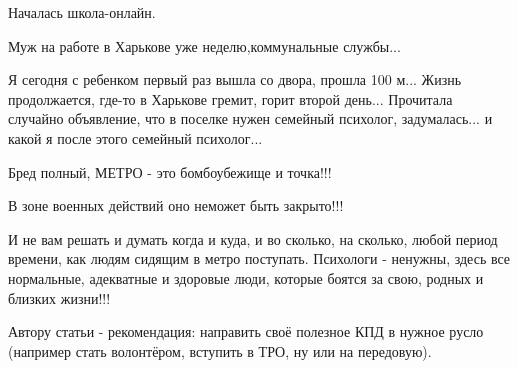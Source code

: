 \begin{itemize}
Началась школа-онлайн.

Муж на работе в Харькове уже неделю,коммунальные службы...

Я сегодня с ребенком первый раз вышла со двора, прошла 100 м... Жизнь
продолжается, где-то в Харькове гремит, горит второй день...  Прочитала
случайно объявление, что в поселке нужен семейный психолог, задумалась... и
какой я после этого семейный психолог...


Бред полный, МЕТРО - это бомбоубежище и точка!!!

В зоне военных действий оно неможет быть закрыто!!!

И не вам решать и думать когда и куда, и во сколько, на сколько, любой период
времени, как людям сидящим в метро поступать. Психологи - ненужны, здесь все
нормальные, адекватные и здоровые люди, которые боятся за свою, родных и
близких жизни!!!

Автору статьи - рекомендация: направить своё полезное КПД в нужное русло
(например стать волонтёром, вступить в ТРО, ну или на передовую).


\end{itemize} %
